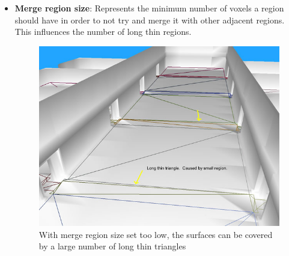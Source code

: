 \documentclass[a4paper,11pt]{article}
\begin{document}
\begin{itemize}
  
%  
  
  \item\textbf{Merge region size}: Represents the minimum number of voxels a region should have in order to not try and merge it with other adjacent regions. This influences the number of long thin regions.
  
  \begin{figure}[H]
	\centering
	\includegraphics[width=1\textwidth]{merge_region_0.png}
	\caption{With merge region size set too low, the surfaces can be covered by a large number of long thin triangles}
\end{figure}
  

\end{itemize}
\end{document}
